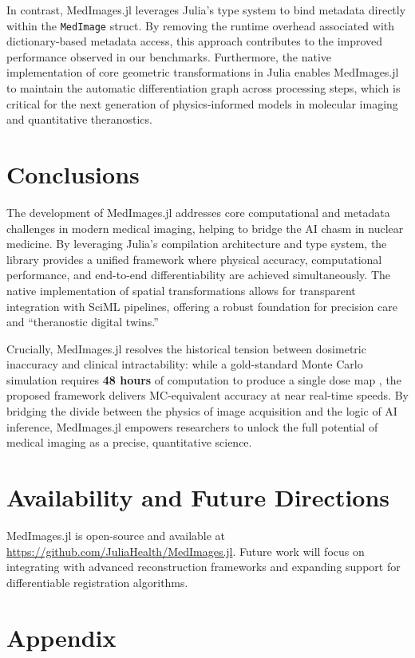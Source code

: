 \documentclass[a4paper,10pt]{elsarticle}
\begin{document}
In contrast, MedImages.jl leverages Julia's type system to bind metadata directly within the \texttt{MedImage} struct. By removing the runtime overhead associated with dictionary-based metadata access, this approach contributes to the improved performance observed in our benchmarks. Furthermore, the native implementation of core geometric transformations in Julia enables MedImages.jl to maintain the automatic differentiation graph across processing steps, which is critical for the next generation of physics-informed models in molecular imaging and quantitative theranostics.

\section{Conclusions}
The development of MedImages.jl addresses core computational and metadata challenges in modern medical imaging, helping to bridge the AI chasm in nuclear medicine. By leveraging Julia's compilation architecture and type system, the library provides a unified framework where physical accuracy, computational performance, and end-to-end differentiability are achieved simultaneously. The native implementation of spatial transformations allows for transparent integration with SciML pipelines, offering a robust foundation for precision care and ``theranostic digital twins.'' 

Crucially, MedImages.jl resolves the historical tension between dosimetric inaccuracy and clinical intractability: while a gold-standard Monte Carlo simulation requires \textbf{48 hours} of computation to produce a single dose map  \cite{KimSuh2024}, the proposed framework delivers MC-equivalent accuracy at near real-time speeds. By bridging the divide between the physics of image acquisition and the logic of AI inference, MedImages.jl empowers researchers to unlock the full potential of medical imaging as a precise, quantitative science.

\section*{Availability and Future Directions}
MedImages.jl is open-source and available at \url{https://github.com/JuliaHealth/MedImages.jl}. Future work will focus on integrating with advanced reconstruction frameworks and expanding support for differentiable registration algorithms.

\section{Appendix}
\end{document}
